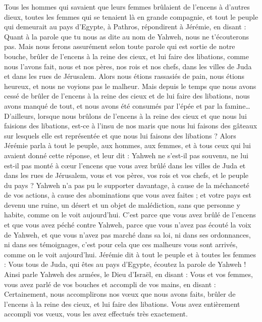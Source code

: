 \begin{multicols}{2}
Tous les hommes qui savaient que leurs femmes brûlaient de l'encens à d'autres dieux, toutes les femmes qui se tenaient là en grande compagnie, et tout le peuple qui demeurait au pays d'Egypte, à Pathros, répondirent à Jérémie, en disant :
Quant à la parole que tu nous as dite au nom de Yahweh, nous ne t'écouterons pas.
Mais nous ferons assurément selon toute parole qui est sortie de notre bouche, brûler de l'encens à la reine des cieux, et lui faire des libations, comme nous l'avons fait, nous et nos pères, nos rois et nos chefs, dans les villes de Juda et dans les rues de Jérusalem. Alors nous étions rassasiés de pain, nous étions heureux, et nous ne voyions pas le malheur.
Mais depuis le temps que nous avons cessé de brûler de l'encens à la reine des cieux et de lui faire des libations, nous avons manqué de tout, et nous avons été consumés par l'épée et par la famine…
D'ailleurs, lorsque nous brûlons de l'encens à la reine des cieux et que nous lui faisions des libations, est-ce à l'insu de nos maris que nous lui faisons des gâteaux sur lesquels elle est représentée et que nous lui faisons des libations ?
Alors Jérémie parla à tout le peuple, aux hommes, aux femmes, et à tous ceux qui lui avaient donné cette réponse, et leur dit :
Yahweh ne s'est-il pas souvenu, ne lui est-il pas monté à cœur l'encens que vous avez brûlé dans les villes de Juda et dans les rues de Jérusalem, vous et vos pères, vos rois et vos chefs, et le peuple du pays ?
Yahweh n'a pas pu le supporter davantage, à cause de la méchanceté de vos actions, à cause des abominations que vous avez faites ; et votre pays est devenu une ruine, un désert et un objet de malédiction, sans que personne y habite, comme on le voit aujourd'hui.
C'est parce que vous avez brûlé de l'encens et que vous avez péché contre Yahweh, parce que vous n'avez pas écouté la voix de Yahweh, et que vous n'avez pas marché dans sa loi, ni dans ses ordonnances, ni dans ses témoignages, c'est pour cela que ces malheurs vous sont arrivés, comme on le voit aujourd'hui.
Jérémie dit à tout le peuple et à toutes les femmes : Vous tous de Juda, qui êtes au pays d'Egypte, écoutez la parole de Yahweh !
Ainsi parle Yahweh des armées, le Dieu d'Israël, en disant : Vous et vos femmes, vous avez parlé de vos bouches et accompli de vos mains, en disant : Certainement, nous accomplirons nos vœux que nous avons faits, brûler de l'encens à la reine des cieux, et lui faire des libations. Vous avez entièrement accompli vos vœux, vous les avez effectués très exactement.

\end{multicols}
